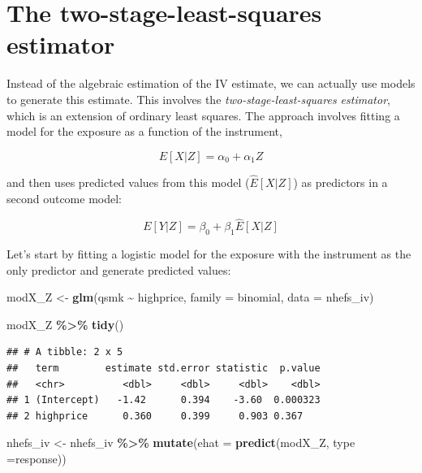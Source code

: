 \documentclass[
]{book}
\newenvironment{Shaded}{\begin{snugshade}}{\end{snugshade}}
\newcommand{\AttributeTok}[1]{\textcolor[rgb]{0.13,0.29,0.53}{#1}}
\newcommand{\FunctionTok}[1]{\textcolor[rgb]{0.13,0.29,0.53}{\textbf{#1}}}
\newcommand{\NormalTok}[1]{#1}
\newcommand{\OtherTok}[1]{\textcolor[rgb]{0.56,0.35,0.01}{#1}}
\newcommand{\SpecialCharTok}[1]{\textcolor[rgb]{0.81,0.36,0.00}{\textbf{#1}}}
\newcommand{\StringTok}[1]{\textcolor[rgb]{0.31,0.60,0.02}{#1}}
\begin{document}
\section{The two-stage-least-squares estimator}\label{the-two-stage-least-squares-estimator}

Instead of the algebraic estimation of the IV estimate, we can actually use models to generate this estimate. This involves the \emph{two-stage-least-squares estimator}, which is an extension of ordinary least squares. The approach involves fitting a model for the exposure as a function of the instrument,

\[
E[X|Z] = \alpha_{0} + \alpha_{1}Z
\]

and then uses predicted values from this model (\(\hat{E}[X|Z]\)) as predictors in a second outcome model:

\[
E[Y|Z] = \beta_{0} + \beta_{1}\hat{E}[X|Z]
\]

Let's start by fitting a logistic model for the exposure with the instrument as the only predictor and generate predicted values:

\begin{Shaded}
\begin{Highlighting}[]
\NormalTok{modX\_Z }\OtherTok{\textless{}{-}} \FunctionTok{glm}\NormalTok{(qsmk }\SpecialCharTok{\textasciitilde{}}\NormalTok{ highprice, }\AttributeTok{family =}\NormalTok{ binomial, }\AttributeTok{data =}\NormalTok{ nhefs\_iv)}

\NormalTok{modX\_Z }\SpecialCharTok{\%\textgreater{}\%}
  \FunctionTok{tidy}\NormalTok{()}
\end{Highlighting}
\end{Shaded}

\begin{verbatim}
## # A tibble: 2 x 5
##   term        estimate std.error statistic  p.value
##   <chr>          <dbl>     <dbl>     <dbl>    <dbl>
## 1 (Intercept)   -1.42      0.394    -3.60  0.000323
## 2 highprice      0.360     0.399     0.903 0.367
\end{verbatim}

\begin{Shaded}
\begin{Highlighting}[]
\NormalTok{nhefs\_iv }\OtherTok{\textless{}{-}}\NormalTok{ nhefs\_iv }\SpecialCharTok{\%\textgreater{}\%}
  \FunctionTok{mutate}\NormalTok{(}\AttributeTok{ehat =} \FunctionTok{predict}\NormalTok{(modX\_Z, }\AttributeTok{type =}\StringTok{\textquotesingle{}response\textquotesingle{}}\NormalTok{))}
\end{Highlighting}
\end{Shaded}
\end{document}

